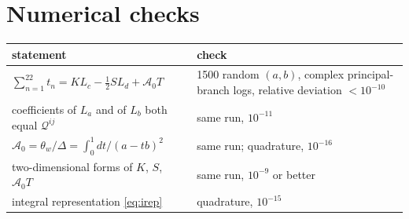 \documentclass[10pt]{article}
\numberwithin{equation}{section}
\begin{document}
\section{Numerical checks}
\begin{center}
\renewcommand{\arraystretch}{1.2}
\begin{tabular}{p{9cm}|p{7.5cm}}
statement & check\\ \hline
$\sum_{n=1}^{22}t_{n}=K L_{c}-\tfrac12SL_{d}+\mathcal{A}_{0}T$ & 1500 random $(a,b)$, complex principal-branch logs, relative deviation $<10^{-10}$\\
coefficients of $L_{a}$ and of $L_{b}$ both equal $\mathcal{Q}^{ij}$ & same run, $10^{-11}$\\
$\mathcal{A}_{0}=\theta_{w}/\Delta=\int_{0}^{1}dt/(a-tb)^{2}$ & same run; quadrature, $10^{-16}$\\
two-dimensional forms of $K$, $S$, $\mathcal{A}_{0}T$ & same run, $10^{-9}$ or better\\
integral representation \eqref{eq:irep} & quadrature, $10^{-15}$
\end{tabular}
\end{center}
\end{document}
